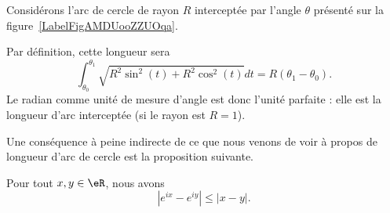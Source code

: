 \begin{example}
	Considérons l'arc de cercle de rayon \( R\) interceptée par l'angle \( \theta\) présenté sur la figure~\ref{LabelFigAMDUooZZUOqa}. %
	\newcommand{\CaptionFigAMDUooZZUOqa}{Quelle est la longueur de la partie bleue de ce cercle de rayon \( R\) ?}
	

	Par définition, cette longueur sera
	\begin{equation}
		\int_{\theta_0}^{\theta_1}\sqrt{R^2\sin^2(t)+R^2\cos^2(t)}dt=R(\theta_1-\theta_0).
	\end{equation}
	Le radian comme unité de mesure d'angle est donc l'unité parfaite : elle est la longueur d'arc interceptée (si le rayon est \( R=1\)).
\end{example}

Une conséquence à peine indirecte de ce que nous venons de voir à propos de longueur d'arc de cercle est la proposition suivante.
\begin{proposition}     \label{PROPooYMMKooSUBtoo}
	Pour tout \( x,y\in \eR\), nous avons
	\begin{equation}
		|  e^{ix}- e^{iy} |\leq | x-y |.
	\end{equation}
\end{proposition}

